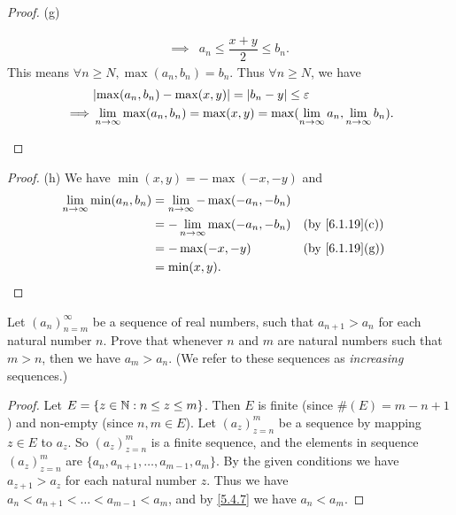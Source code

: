 \begin{proof}{(g)}
\begin{itemize}
\begin{align*}
            \implies & a_n \leq \dfrac{x + y}{2} \leq b_n.
          \end{align*}
          This means \(\forall n \geq N, \max(a_n, b_n) = b_n\).
          Thus \(\forall n \geq N\), we have
          \begin{align*}
                     & \abs{\max(a_n, b_n) - \max(x, y)} = \abs{b_n - y} \leq \varepsilon                                        \\
            \implies & \lim_{n \to \infty} \max(a_n, b_n) = \max(x, y) = \max(\lim_{n \to \infty} a_n, \lim_{n \to \infty} b_n).
          \end{align*}
  \end{itemize}
\end{proof}

\begin{proof}{(h)}
  We have \(\min(x, y) = -\max(-x, -y)\) and
  \begin{align*}
    \lim_{n \to \infty} \min(a_n, b_n) & = \lim_{n \to \infty} -\max(-a_n, -b_n)                                   \\
                                       & = -\lim_{n \to \infty} \max(-a_n, -b_n) &  & \text{(by \cref{6.1.19}(c))} \\
                                       & = -\max(-x, -y)                         &  & \text{(by \cref{6.1.19}(g))} \\
                                       & = \min(x, y).
  \end{align*}
\end{proof}

\exercisesection

\begin{ex}\label{ex:6.1.1}
  Let \((a_n)_{n = m}^\infty\) be a sequence of real numbers, such that \(a_{n + 1} > a_n\) for each natural number \(n\).
  Prove that whenever \(n\) and \(m\) are natural numbers such that \(m > n\), then we have \(a_m > a_n\).
  (We refer to these sequences as \emph{increasing} sequences.)
\end{ex}

\begin{proof}
  Let \(E = \{z \in \mathbb{N} : n \leq z \leq m\}\).
  Then \(E\) is finite (since \(\#(E) = m - n + 1\)) and non-empty (since \(n, m \in E\)).
  Let \((a_z)_{z = n}^m\) be a sequence by mapping \(z \in E\) to \(a_z\).
  So \((a_z)_{z = n}^m\) is a finite sequence, and the elements in sequence \((a_z)_{z = n}^m\) are \(\{a_n, a_{n + 1}, \dots, a_{m - 1}, a_m\}\).
  By the given conditions we have \(a_{z + 1} > a_z\) for each natural number \(z\).
  Thus we have \(a_n < a_{n + 1} < \dots < a_{m - 1} < a_m\), and by \cref{5.4.7} we have \(a_n < a_m\).
\end{proof}

